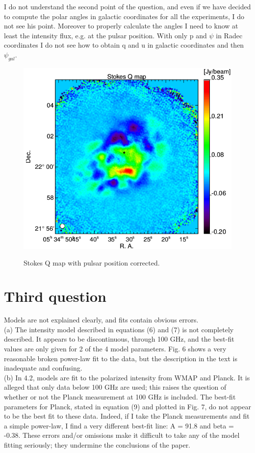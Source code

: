 \documentclass[report,onecolumn]{aa}
\begin{document}
{\color{blue}I do not understand the second point of the question, and even if we have decided to compute the polar angles in galactic coordinates for all the experiments, I do not see his point. Moreover to properly calculate the angles I need to know at least the intensity flux, e.g. at the pulsar position. With only p and $\psi$ in Radec coordinates I do not see how to obtain q and u in galactic coordinates and then $\psi_{gal}$.}

\begin{figure}[!h]
\centering
     	  { \includegraphics[width=0.5\linewidth,keepaspectratio]{referee_figures/crab_q_2mm_pulsPositionCor.png}}
\caption{Stokes Q map with pulsar position corrected.}     	  
 
\label{Q_map}
\end{figure}




\section{Third question}
Models are not explained clearly, and fits contain obvious errors.\\
(a) The intensity model described in equations (6) and (7) is not
completely described. It appears to be discontinuous, through 100
GHz, and the best-fit values are only given for 2 of the 4 model
parameters. Fig. 6 shows a very reasonable broken power-law fit to
the data, but the description in the text is inadequate and confusing.\\
(b) In 4.2, models are fit to the polarized intensity from WMAP and
Planck. It is alleged that only data below 100 GHz are used; this
raises the question of whether or not the Planck measurement at 100
GHz is included. The best-fit parameters for Planck, stated in
equation (9) and plotted in Fig. 7, do not appear to be the best fit
to these data. Indeed, if I take the Planck measurements and fit a
simple power-law, I find a very different best-fit line: A = 91.8 and
beta = -0.38.
These errors and/or omissions make it difficult to take any of the
model fitting seriously; they undermine the conclusions of the paper.
\\ \\
\end{document}
